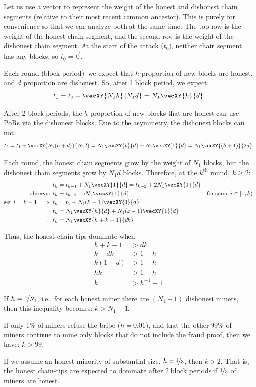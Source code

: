 Let us use a vector to represent the weight of the honest and dishonest chain segments (relative to their most recent common ancestor).
This is purely for convenience so that we can analyze both at the same time.
The top row is the weight of the honest chain segment, and the second row is the weight of the dishonest chain segment.
At the start of the attack ($t_0$), neither chain segment has any blocks, so $t_0 = \vec{0}$.

Each round (block period), we expect that $h$ proportion of new blocks are honest, and $d$ proportion are dishonest.
So, after 1 block period, we expect:
\begin{equation*}
    t_1 = t_0 + \vecXY{N_1 h}{N_1 d} = N_1 \vecXY{h}{d}
\end{equation*}

After 2 block periods, the $h$ proportion of new blocks that are honest can use PoRs via the dishonest blocks.
Due to the asymmetry, the dishonest blocks can not.
\begin{equation*}
    t_2 = t_1 + \vecXY{N_1 (h+d)}{N_1 d} = N_1 \vecXY{h}{d} + N_1 \vecXY{1}{d} = N_1 \vecXY{(h + 1)}{2 d}
\end{equation*}

Each round, the honest chain segments grow by the weight of $N_1$ blocks, but the dishonest chain segments grow by $N_1 d$ blocks.
Therefore, at the $k^\text{th}$ round, $k \ge 2$:
\begin{align}
    t_k &= t_{k-1} + N_1 \vecXY{1}{d} = t_{k-2} + 2 N_1 \vecXY{1}{d} \nonumber \\
    \text{observe: } t_k &= t_{k-i} + i N_1 \vecXY{1}{d} & \text{for some } i \in [1, k) \nonumber \\
    \text{set } i = k - 1 \implies
    t_k &= t_1 + N_1 (k-1) \vecXY{1}{d} \nonumber \\
    t_k &= N_1 \vecXY{h}{d} + N_1 (k-1) \vecXY{1}{d} \nonumber \\
    \therefore t_k &= N_1 \vecXY{h + k - 1}{dk} \label{eq:h-to-d-chain-segs}
\end{align}

Thus, the honest chain-tips dominate when
\begin{align*}
    h + k - 1 &> dk \\
    k - dk &> 1 - h \\
    k(1 - d) &> 1-h \\
    h k &> 1-h \\
    k &> h^{-1} - 1
\end{align*}

If $h = \nicefrac{1}{N_1}$, i.e., for each honest miner there are $(N_1 - 1)$ dishonest miners, then this inequality becomes: $k > N_1 - 1$.

If only 1\% of miners refuse the bribe ($h = 0.01$), and that the other 99\% of miners continue to mine only blocks that do not include the fraud proof, then we have: $k > 99$.

If we assume an honest minority of substantial size, $h = \nicefrac{1}{3}$, then $k > 2$.
That is, the honest chain-tips are expected to dominate after $2$ block periods if $\nicefrac{1}{3}$ of miners are honest.
